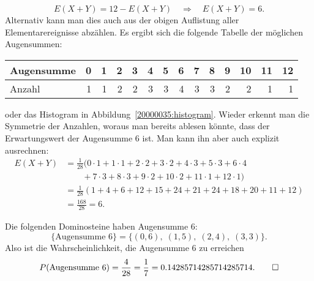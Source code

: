 \begin{loesung}
\begin{teilaufgaben}
\[
E(X+Y)= 12-E(X+Y)\quad\Rightarrow\quad E(X+Y)=6.
\]
Alternativ kann man dies auch aus der obigen Auflistung aller
Elementarereignisse abzählen. Es ergibt sich die folgende Tabelle
der möglichen Augensummen:
\begin{center}
\begin{tabular}{|l|rrrrrrrrrrrrr|}
\hline
Augensumme & 0& 1& 2& 3& 4& 5& 6& 7& 8& 9& 10& 11& 12\\
\hline
Anzahl     & 1& 1& 2& 2& 3& 3& 4& 3& 3& 2&  2&  1&  1\\
\hline
\end{tabular}
\end{center}
oder das Histogram in Abbildung~\ref{20000035:histogram}.
Wieder erkennt man die Symmetrie der Anzahlen, woraus man bereits
ablesen könnte, dass der Erwartungswert der Augensumme $6$ ist.
Man kann ihn aber auch explizit ausrechnen:
\begin{align*}
E(X+Y)&=
\frac1{28}(
0\cdot 1+
1\cdot 1+
2\cdot 2+
3\cdot 2+
4\cdot 3+
5\cdot 3+
6\cdot 4\\
&\qquad +
7\cdot 3+
8\cdot 3+
9\cdot 2+
10\cdot 2+
11\cdot 1+
12\cdot 1
)
\\
&=
\frac1{28}(1+4+6+12+15+24+21+24+18+20+11+12)\\
&=
\frac{168}{28}=6.
\end{align*}
\item
Die folgenden Dominosteine haben Augensumme 6:
\[
\{\text{Augensumme 6}\}
=\{
(0,6),\;
(1,5),\;
(2,4),\;
(3,3)\}.
\]
Also ist die Wahrscheinlichkeit, die Augensumme 6 zu erreichen
\[
P(\text{Augensumme 6})=\frac{4}{28}=\frac17=0.14285714285714285714.
\qedhere
\]
\end{teilaufgaben}
\end{loesung}

